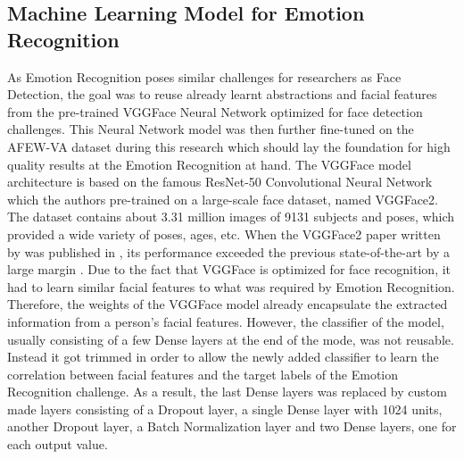 \subsection{Machine Learning Model for Emotion Recognition}
As Emotion Recognition poses similar challenges for researchers as Face Detection, the goal was to reuse already learnt abstractions and facial features from the pre-trained VGGFace Neural Network optimized for face detection challenges. This Neural Network model was then further fine-tuned on the AFEW-VA dataset during this research which should lay the foundation for high quality results at the Emotion Recognition at hand.
\newline\newline
The VGGFace model architecture is based on the famous ResNet-50 Convolutional Neural Network which the authors \citet{Cao:2018:VGGFace2} pre-trained on a large-scale face dataset, named VGGFace2. The dataset contains about 3.31 million images of 9131 subjects and poses, which provided a wide variety of poses, ages, etc. When the VGGFace2 paper written by \citet{Cao:2018:VGGFace2} was published in \citeyear{Cao:2018:VGGFace2}, its performance exceeded the previous state-of-the-art by a large margin \citep{Cao:2018:VGGFace2}.
\newline\newline
Due to the fact that VGGFace is optimized for face recognition, it had to learn similar facial features to what was required by Emotion Recognition. Therefore, the weights of the VGGFace model already encapsulate the extracted information from a person's facial features. However, the classifier of the model, usually consisting of a few Dense layers at the end of the mode, was not reusable. Instead it got trimmed in order to allow the newly added classifier to learn the correlation between facial features and the target labels of the Emotion Recognition challenge. As a result, the last Dense layers was replaced by custom made layers consisting of a Dropout layer, a single Dense layer with 1024 units, another Dropout layer, a Batch Normalization layer and two Dense layers, one for each output value.